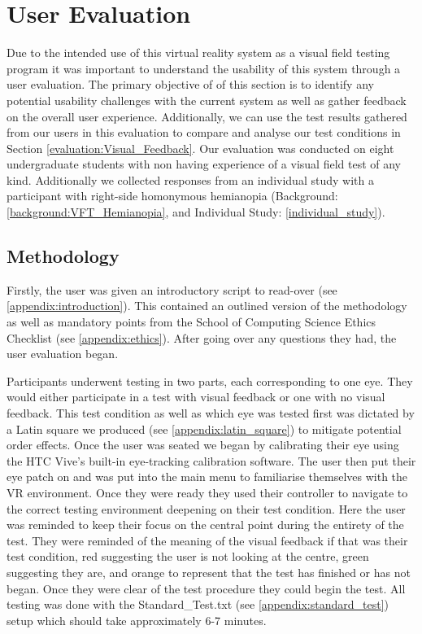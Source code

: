 \documentclass{l4proj}
\begin{document}
\section{User Evaluation}
Due to the intended use of this virtual reality system as a visual field testing program it was important to understand the usability of this system through a user evaluation. The primary objective of of this section is to identify any potential usability challenges with the current system as well as gather feedback on the overall user experience. Additionally, we can use the test results gathered from our users in this evaluation to compare and analyse our test conditions in Section \ref{evaluation:Visual_Feedback}. Our evaluation was conducted on eight undergraduate students with non having experience of a visual field test of any kind. Additionally we collected responses from an individual study with a participant with right-side homonymous hemianopia (Background: \ref{background:VFT_Hemianopia}, and Individual Study: \ref{individual_study}).
\subsection{Methodology}
Firstly, the user was given an introductory script to read-over (see \ref{appendix:introduction}). This contained an outlined version of the methodology as well as mandatory points from the School of Computing Science Ethics Checklist (see \ref{appendix:ethics}). After going over any questions they had, the user evaluation began.

Participants underwent testing in two parts, each corresponding to one eye. They would either participate in a test with visual feedback or one with no visual feedback. This test condition as well as which eye was tested first was dictated by a Latin square we produced (see \ref{appendix:latin_square}) to mitigate potential order effects. Once the user was seated we began by calibrating their eye using the HTC Vive's built-in eye-tracking calibration software. The user then put their eye patch on and was put into the main menu to familiarise themselves with the VR environment. Once they were ready they used their controller to navigate to the correct testing environment deepening on their test condition. Here the user was reminded to keep their focus on the central point during the entirety of the test. They were reminded of the meaning of the visual feedback if that was their test condition, red suggesting the user is not looking at the centre, green suggesting they are, and orange to represent that the test has finished or has not began. Once they were clear of the test procedure they could begin the test. All testing was done with the Standard\_Test.txt (see \ref{appendix:standard_test}) setup which should take approximately 6-7 minutes. 
\end{document}
